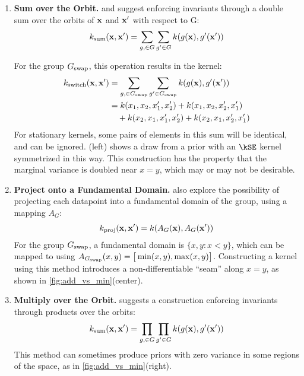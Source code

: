 \begin{enumerate}

\item {\bf Sum over the Orbit.} 
\citet{ginsbourger2012argumentwise} and \citet{kondor2008group} suggest enforcing invariants through a double sum over the orbits of ${\bf{x}}$ and ${\bf{x}}'$ with respect to G:
%
\begin{align}
k_\textnormal{sum}({\bf{x}}, {\bf{x}}') = \sum_{g, \in G} \sum_{g' \in G} k( g( {\bf{x}} ), g'( {\bf{x}}') )
\end{align}

For the group $G_\textnormal{swap}$, this operation results in the kernel:
%
\begin{align}
k_\textnormal{switch}({\bf{x}}, {\bf{x}}')
& = \sum_{g, \in G_\textnormal{swap}} \sum_{g' \in G_\textnormal{swap}} k( g( {\bf{x}} ), g'( {\bf{x}}') ) \\
& = k(x_1, x_2, x_1', x_2') + k(x_1, x_2, x_2', x_1')  \nonumber \\ 
& \quad + k(x_2, x_1, x_1', x_2') + k(x_2, x_1, x_2', x_1')
\end{align}
%
For stationary kernels, some pairs of elements in this sum will be identical, and can be ignored.
(left) shows a draw from a \gp{} prior with an $\kSE$ kernel symmetrized in this way.
This construction has the property that the marginal variance is doubled near $x = y$, which may or may not be desirable.



\item {\bf Project onto a Fundamental Domain.}
\citet{Invariances13} also explore the possibility of projecting each datapoint into a fundamental domain of the group, using a mapping $A_G$:
%
\begin{align}
k_\textnormal{proj}({\bf{x}}, {\bf{x}}') = k( A_G({\bf{x}}), A_G( {\bf{x}}') )
\end{align}
%
For the group $G_\textnormal{swap}$, a fundamental domain is $\{x, y : x < y\}$, which can be mapped to using $A_{G_\textnormal{swap}}( x, y ) = \big[ \min(x,y), \max(x,y) \big]$.
Constructing a kernel using this method introduces a non-differentiable  ``seam'' along $x = y$, as shown in \cref{fig:add_vs_min}(center).

\item {\bf Multiply over the Orbit.}
\citet{adams2013product} suggests a construction enforcing invariants through products over the orbits:
%
\begin{align}
k_\textnormal{sum}({\bf{x}}, {\bf{x}}') = \prod_{g, \in G} \prod_{g' \in G} k( g( {\bf{x}} ), g'( {\bf{x}}') )
\end{align}
%
This method can sometimes produce \gp{} priors with zero variance in some regions of the space, as in \cref{fig:add_vs_min}(right).
\end{enumerate}
